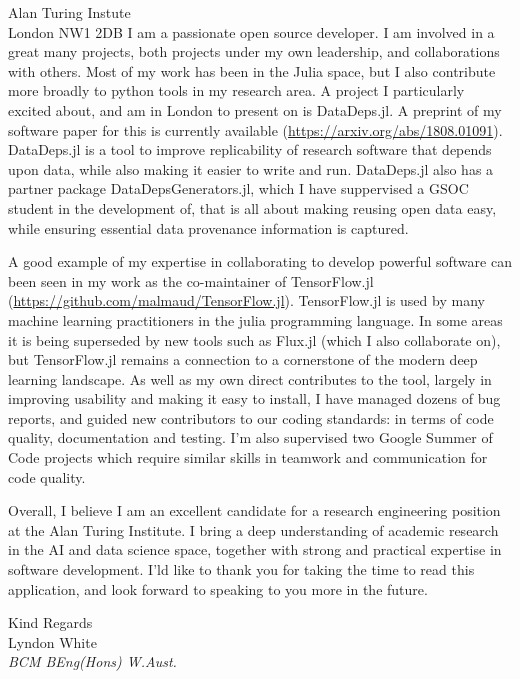 \documentclass[]{letter}
\begin{document}
\begin{letter}{Alan Turing Instute\\London NW1 2DB}
I am a passionate open source developer.
I am involved in a great many projects, both projects under my own leadership,
and collaborations with others.
Most of my work has been in the Julia space, but I also contribute more broadly to python tools in my research area.
A project I particularly excited about, and am in London to present on is DataDeps.jl. A preprint of my software paper for this is currently available (\url{https://arxiv.org/abs/1808.01091}).
DataDeps.jl is a tool to improve replicability of research software that depends upon data, while also making it easier to write and run.
DataDeps.jl also has a partner package DataDepsGenerators.jl, which I have suppervised a GSOC student in the development of, that is all about making reusing open data easy, while ensuring essential data provenance information is captured.





A good example of my expertise in collaborating to develop powerful software can been seen in my work as the co-maintainer of TensorFlow.jl (\url{https://github.com/malmaud/TensorFlow.jl}).
TensorFlow.jl is used by many machine learning practitioners in the julia programming language. In some areas it is being superseded by new tools such as Flux.jl (which I also collaborate on), but TensorFlow.jl remains a connection to a cornerstone of the modern deep learning landscape.
As well as my own direct contributes to the tool, largely in improving usability and making it easy to install,
I have managed dozens of bug reports, and guided new contributors to our coding standards: in terms of code quality, documentation and testing.
I'm also supervised two Google Summer of Code projects which require similar skills in teamwork and communication for code quality.


Overall, I believe I am an excellent candidate for a research engineering position at the Alan Turing Institute.
I bring a deep understanding of academic research in the AI and data science space, together with strong and practical expertise in software development.
I'ld like to thank you for taking the time to read this application,
and look forward to speaking to you more in the future.

\vfill
Kind Regards\\Lyndon White\\
\emph{BCM BEng(Hons) W.Aust.}
\vfill
\vfill
\vfill



\end{letter}
\end{document}
